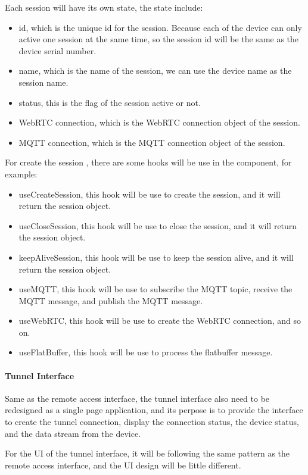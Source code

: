 Each session will have its own state, the state include:
\begin{itemize}
    \item id, which is the unique id for the session. Because each of the device can only
    active one session at the same time, so the session id will be the same as the device serial number.
    \item name, which is the name of the session, we can use the device name 
    as the session name.
    \item status, this is the flag of the session active or not.
    \item WebRTC connection, which is the WebRTC connection object of the session.
    \item MQTT connection, which is the MQTT connection object of the session.
\end{itemize}

For create the session , there are some hooks will be use in the component, for example:
\begin{itemize}
    \item useCreateSession, this hook will be use to create the session, 
    and it will return the session object.
    \item useCloseSession, this hook will be use to close the session, 
    and it will return the session object.
    \item keepAliveSession, this hook will be use to keep the session alive, 
    and it will return the session object.
    \item useMQTT, this hook will be use to subscribe the MQTT topic, receive the MQTT message, 
    and publish the MQTT message.
    \item useWebRTC, this hook will be use to create the WebRTC connection, and so on.
    \item useFlatBuffer, this hook will be use to process the flatbuffer message.
\end{itemize}

\paragraph{Tunnel Interface}
Same as the remote access interface, the tunnel interface also need to be redesigned  
as a single page application,
and its perpose is to provide the interface to create the tunnel connection, display the connection status,
the device status, and the data stream from the device.

For the UI of the tunnel interface, it will be following the same pattern as the remote access interface,
and the UI design will be little different.

